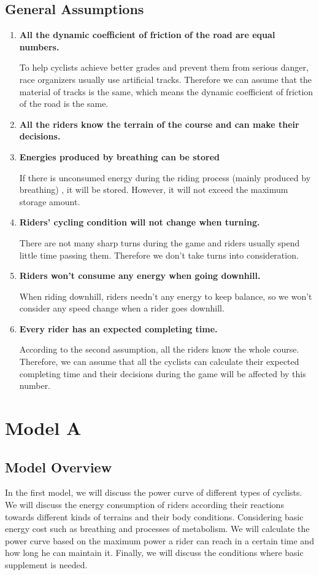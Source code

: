 \documentclass[14pt]{article}
\begin{document}
	\subsection{General Assumptions}
	\begin{enumerate}
		\item  \textbf{All the dynamic coefficient of friction of the road are equal numbers.}

				To help cyclists achieve better grades and prevent them from serious danger, race organizers usually use artificial tracks. Therefore we can assume that the material of tracks is the same, which means the dynamic coefficient of friction of the road is the same.
		\item  \textbf{All the riders know the terrain of the course and can make their decisions.}
		\item  \textbf{Energies produced by breathing can be stored}
		
				If there is unconsumed energy during the riding process (mainly produced by breathing) , it will be stored. However, it will not exceed the maximum storage amount.
		\item  \textbf{Riders' cycling condition will not change when turning.}
		
				There are not many sharp turns during the game and riders usually spend little time passing them. Therefore we don't take turns into consideration.
		\item \textbf{Riders won't consume any energy when going downhill.}
		
				When riding downhill, riders needn't any energy to keep balance, so we won't consider any speed change when a rider goes downhill.
		\item \textbf{Every rider has an expected completing time.}
			
				According to the second assumption, all the riders know the whole course. Therefore, we can assume that all the cyclists can calculate their expected completing time and their decisions during the game will be affected by this number.
		
	\end{enumerate}
	
	\section{Model A}
	\subsection{Model Overview}
	In the first model, we will discuss the power curve of different types of cyclists. We will discuss the energy consumption of riders according their reactions towards different kinds of terrains and their body conditions. Considering basic energy cost such as breathing and processes of metabolism. We will calculate the power curve based on the maximum power a rider can reach in a certain time and how long he can maintain it. Finally, we will discuss the conditions where basic supplement is needed.
\end{document}
